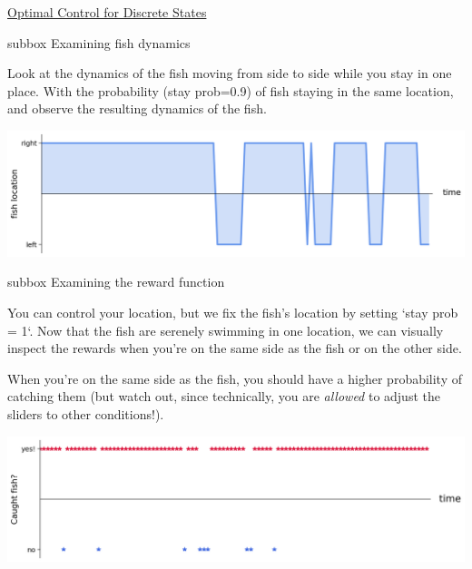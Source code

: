 \begin{textbox}{\href{https://compneuro.neuromatch.io/tutorials/W3D3_OptimalControl/student/W3D3_Tutorial1.html}{Optimal Control for Discrete States }   }


\begin{subbox}{subbox}{ Examining fish dynamics}
\scriptsize

Look at the dynamics of the fish moving from side to side while you stay in one place. With the probability (stay prob=0.9) of fish staying in the same location, and observe the resulting dynamics of the fish.

\begin{center}
    
\includegraphics[scale=0.2]{Figures/OC/OC_Figure1.png}
\end{center}

\end{subbox}
\begin{subbox}{subbox}{ Examining the reward function}
\scriptsize

You can control your location, but we fix the fish's location by setting `stay prob = 1`. Now that the fish are serenely swimming in one location, we can visually inspect the rewards when you're on the same side as the fish or on the other side.

When you're on the same side as the fish, you should have a higher probability of catching them (but watch out, since technically, you are \textit{allowed} to adjust the sliders to other conditions!).

\begin{center}
    
\includegraphics[scale=0.2]{Figures/OC/OC_Figure2.png}
\end{center}


\end{subbox}
\end{textbox}
